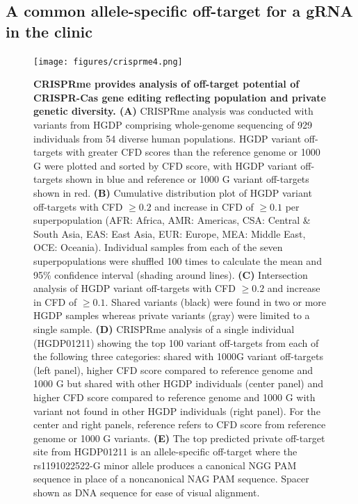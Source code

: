 \documentclass[a4paper, titlepage, openright]{book}
\newcommand{\crisprme}{CRISPRme\xspace}
\begin{document}
\subsection{A common allele-specific off-target for a gRNA in the clinic}
\begin{figure}
	\centering
	\texttt{[image: figures/crisprme4.png]}
	\caption[\crisprme provides analysis of off-target potential of CRISPR-Cas gene editing reflecting population and private genetic diversity]{\textbf{\crisprme provides analysis of off-target potential of CRISPR-Cas gene editing reflecting population and private genetic diversity. (A)} \crisprme analysis was conducted with variants from HGDP comprising whole-genome sequencing of 929 individuals from 54 diverse human populations. HGDP variant off-targets with greater CFD scores than the reference genome or 1000 G were plotted and sorted by CFD score, with HGDP variant off-targets shown in blue and reference or 1000 G variant off-targets shown in red. \textbf{(B)} Cumulative distribution plot of HGDP variant off-targets with CFD $\geq 0.2$ and increase in CFD of $\geq 0.1$ per superpopulation (AFR: Africa, AMR: Americas, CSA: Central \& South Asia, EAS: East Asia, EUR: Europe, MEA: Middle East, OCE: Oceania). Individual samples from each of the seven superpopulations were shuffled 100 times to calculate the mean and 95\% confidence interval (shading around lines).  \textbf{(C)} Intersection analysis of HGDP variant off-targets with CFD $\geq 0.2$ and increase in CFD of $\geq 0.1$. Shared variants (black) were found in two or more HGDP samples whereas private variants (gray) were limited to a single sample. \textbf{(D)} \crisprme analysis of a single individual (HGDP01211) showing the top 100 variant off-targets from each of the following three categories: shared with 1000G variant off-targets (left panel), higher CFD score compared to reference genome and 1000 G but shared with other HGDP individuals (center panel) and higher CFD score compared to reference genome and 1000 G with variant not found in other HGDP individuals (right panel). For the center and right panels, reference refers to CFD score from reference genome or 1000 G variants.  \textbf{(E)} The top predicted private off-target site from HGDP01211 is an allele-specific off-target where the rs1191022522-G minor allele produces a canonical NGG PAM sequence in place of a noncanonical NAG PAM sequence. Spacer shown as DNA sequence for ease of visual alignment.}
	\label{fig:crisprme4}
\end{figure}
\end{document}
